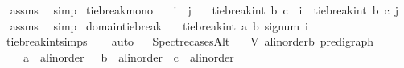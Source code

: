 \begin{isabellebody}
\isadelimproof
\ %
\endisadelimproof
%
\isatagproof
{}\isamarkupfalse%
\ assms\ \isamarkupfalse%
\ simp%
\endisatagproof
{\isafoldproof}%
%
\isadelimproof
%
\endisadelimproof
\isanewline
\isanewline
{}\isamarkupfalse%
\ tie{\isacharunderscore}{\kern0pt}break{\isacharunderscore}{\kern0pt}mono{\isacharcolon}{\kern0pt}\isanewline
\ \ \ {\isachardoublequoteopen}i\ {\isasymle}\ j{\isachardoublequoteclose}\isanewline
\ \ \ {\isachardoublequoteopen}tie{\isacharunderscore}{\kern0pt}break{\isacharunderscore}{\kern0pt}int\ b\ c\ \ i\ {\isasymle}\ tie{\isacharunderscore}{\kern0pt}break{\isacharunderscore}{\kern0pt}int\ b\ c\ j{\isachardoublequoteclose}%
\isadelimproof
\ %
\endisadelimproof
%
\isatagproof
{}\isamarkupfalse%
\ assms\ \isamarkupfalse%
\ simp%
\endisatagproof
{\isafoldproof}%
%
\isadelimproof
%
\endisadelimproof
\isanewline
\isanewline
{}\isamarkupfalse%
\ domain{\isacharunderscore}{\kern0pt}tie{\isacharunderscore}{\kern0pt}break{\isacharcolon}{\kern0pt}\isanewline
\ \ \ {\isachardoublequoteopen}tie{\isacharunderscore}{\kern0pt}break{\isacharunderscore}{\kern0pt}int\ a\ b\ {\isacharparenleft}{\kern0pt}signum\ i{\isacharparenright}{\kern0pt}\ {\isasymin}\ {\isacharbraceleft}{\kern0pt}{\isacharminus}{\kern0pt}{}\ {\isacharcomma}{\kern0pt}{}{\isacharbraceright}{\kern0pt}{\isachardoublequoteclose}\isanewline
%
\isadelimproof
\ \ %
\endisadelimproof
%
\isatagproof
{}\isamarkupfalse%
\ \ tie{\isacharunderscore}{\kern0pt}break{\isacharunderscore}{\kern0pt}int{\isachardot}{\kern0pt}simps\isanewline
\ \ \isamarkupfalse%
\ auto%
\endisatagproof
{\isafoldproof}%
%
\isadelimproof
\ \isanewline
%
\endisadelimproof
\isanewline
\isanewline
\isanewline
{}\isamarkupfalse%
\ Spectre{\isacharunderscore}{\kern0pt}casesAlt{\isacharcolon}{\kern0pt}\isanewline
\ \ \ V{\isacharcolon}{\kern0pt}{\isacharcolon}{\kern0pt}\ {\isachardoublequoteopen}{\isacharparenleft}{\kern0pt}{\isacharprime}{\kern0pt}a{\isacharcolon}{\kern0pt}{\isacharcolon}{\kern0pt}linorder{\isacharcomma}{\kern0pt}{\isacharprime}{\kern0pt}b{\isacharparenright}{\kern0pt}\ pre{\isacharunderscore}{\kern0pt}digraph{\isachardoublequoteclose}\isanewline
\ \ \ \ \ a\ {\isacharcolon}{\kern0pt}{\isacharcolon}{\kern0pt}\ {\isachardoublequoteopen}{\isacharprime}{\kern0pt}a{\isacharcolon}{\kern0pt}{\isacharcolon}{\kern0pt}linorder{\isachardoublequoteclose}\ \ \ b\ {\isacharcolon}{\kern0pt}{\isacharcolon}{\kern0pt}\ {\isachardoublequoteopen}{\isacharprime}{\kern0pt}a{\isacharcolon}{\kern0pt}{\isacharcolon}{\kern0pt}linorder{\isachardoublequoteclose}\ \ c\ {\isacharcolon}{\kern0pt}{\isacharcolon}{\kern0pt}\ {\isachardoublequoteopen}{\isacharprime}{\kern0pt}a{\isacharcolon}{\kern0pt}{\isacharcolon}{\kern0pt}linorder{\isachardoublequoteclose}\isanewline

\end{isabellebody}
